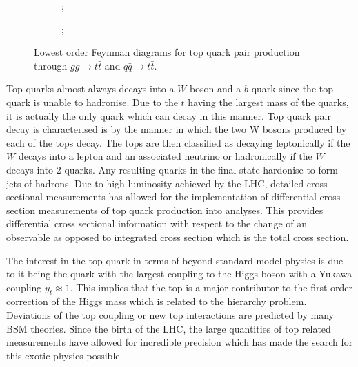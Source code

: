 \documentclass[a4paper,11pt]{article}
\begin{document}
\begin{figure}[htb]
    \centering
    \begin{subfigure}[b]{0.4\textwidth}
        \centering
        ;
    \end{subfigure}
    \hfill
    \begin{subfigure}[b]{0.4\textwidth}
        \centering
        ;
    \end{subfigure}
    \caption{Lowest order Feynman diagrams for top quark pair production through $gg \rightarrow t\bar{t}$ and $q\bar{q} \rightarrow t\bar{t}$.}
    \label{fig:ttbar_production}
\end{figure}

Top quarks almost always decays into a $W$ boson and a $b$ quark since the top quark is unable to hadronise.
Due to the $t$ having the largest mass of the quarks, it is actually the only quark which can decay in this manner.
Top quark pair decay is characterised is by the manner in which the two W bosons produced by each of the tops decay.
The tops are then classified as decaying leptonically if the $W$ decays into a lepton and an associated neutrino or hadronically if the $W$ decays into 2 quarks.
Any resulting quarks in the final state hardonise to form jets of hadrons.
Due to high luminosity achieved by the LHC, detailed cross sectional measurements has allowed for the implementation of differential cross section measurements of top quark production into analyses.
This provides differential cross sectional information with respect to the change of an observable as opposed to integrated cross section which is the total cross section.



\nocite{Thomson:2013zua}
The interest in the top quark in terms of beyond standard model physics is due to it being the quark with the largest coupling to the Higgs boson with a Yukawa coupling $y_{t} \approx 1$.
This implies that the top is a major contributor to the first order correction of the Higgs mass which is related to the hierarchy problem.
Deviations of the top coupling or new top interactions are predicted by many BSM theories.
Since the birth of the LHC, the large quantities of top related measurements have allowed for incredible precision which has made the search for this exotic physics possible.
\end{document}
